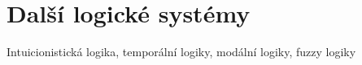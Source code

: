 \chapter{Další logické systémy} \label{appendix:other-logics}

Intuicionistická logika, temporální logiky, modální logiky, fuzzy logiky
\todo


